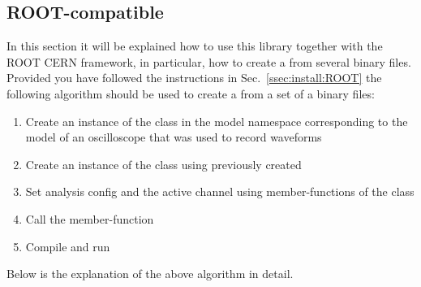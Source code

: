 \subsection{ROOT-compatible}\label{ssec:ROOT}
In this section it will be explained how to use this library together with the ROOT CERN
framework, in particular, how to create a  from several binary files. Provided
you have followed the instructions in Sec.~\ref{ssec:install:ROOT} the following algorithm
should be used to create a  from a set of a binary files:
\begin{enumerate}
    \item Create an instance of the  class in the model namespace
        corresponding to the model of an oscilloscope that was used to record waveforms
    \item Create an instance of the  class using previously created
    \item Set analysis config and the active channel using member-functions of the  class
    \item Call the  member-function
    \item Compile and run
    \label{algo:tree}
\end{enumerate}
Below is the explanation of the above algorithm in detail. 

